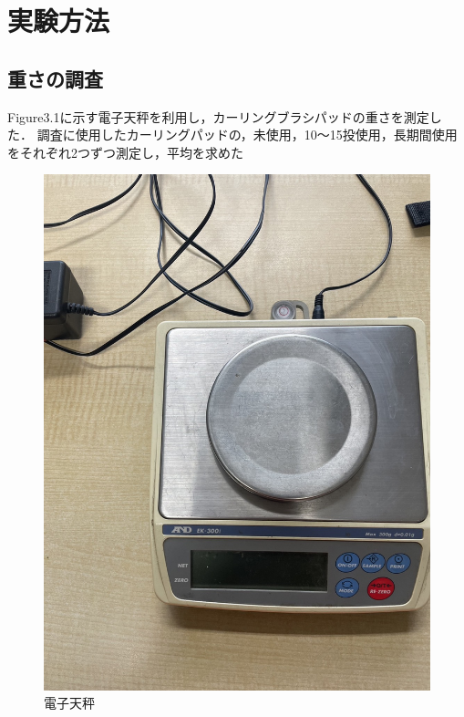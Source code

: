 \documentclass[main]{subfiles}
\begin{document}
\chapter{実験方法}
\section{重さの調査}
Figure3.1に示す電子天秤を利用し，カーリングブラシパッドの重さを測定した．
調査に使用したカーリングパッドの，未使用，10～15投使用，長期間使用をそれぞれ2つずつ測定し，平均を求めた
\begin{figure}[htbp]
    \centering
    \includegraphics[width=0.5\linewidth, height=0.6\linewidth]{figures/denshitenbinn.jpg}
    \caption{電子天秤}
    \label{fig:label}
\end{figure}
\end{document}
